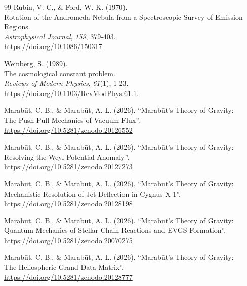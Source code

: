 \documentclass[11pt, a4paper, table]{article}
\begin{document}
\clearpage
\begin{thebibliography}{99}
   Rubin, V. C., \& Ford, W. K. (1970). \\
  Rotation of the Andromeda Nebula from a Spectroscopic Survey of Emission Regions. \\
  \textit{Astrophysical Journal}, \textit{159}, 379-403. \\
  \url{https://doi.org/10.1086/150317}
  
   Weinberg, S. (1989). \\
  The cosmological constant problem. \\
  \textit{Reviews of Modern Physics}, \textit{61}(1), 1-23. \\
  \url{https://doi.org/10.1103/RevModPhys.61.1}.
  
  Marab\={u}t, C. B., \& Marab\={u}t, A. L. (2026). ``Marab\={u}t's Theory of Gravity: \\
  The Push-Pull Mechanics of Vacuum Flux''. \\
  \url{https://doi.org/10.5281/zenodo.20126552}

  Marab\={u}t, C. B., \& Marab\={u}t, A. L. (2026). ``Marab\={u}t's Theory of Gravity: \\
  Resolving the Weyl Potential Anomaly''. \\
  \url{https://doi.org/10.5281/zenodo.20127273}

  Marab\={u}t, C. B., \& Marab\={u}t, A. L. (2026). ``Marab\={u}t's Theory of Gravity: \\
  Mechanistic Resolution of Jet Deflection in Cygnus X-1''. \\
  \url{https://doi.org/10.5281/zenodo.20128198}

  Marab\={u}t, C. B., \& Marab\={u}t, A. L. (2026). ``Marab\={u}t's Theory of Gravity: \\
  Quantum Mechanics of Stellar Chain Reactions and EVGS Formation''. \\
  \url{https://doi.org/10.5281/zenodo.20070275}

  Marab\={u}t, C. B., \& Marab\={u}t, A. L. (2026). ``Marab\={u}t's Theory of Gravity: \\
  The Heliospheric Grand Data Matrix''. \\
  \url{https://doi.org/10.5281/zenodo.20128777}


\end{thebibliography}
\end{document}
